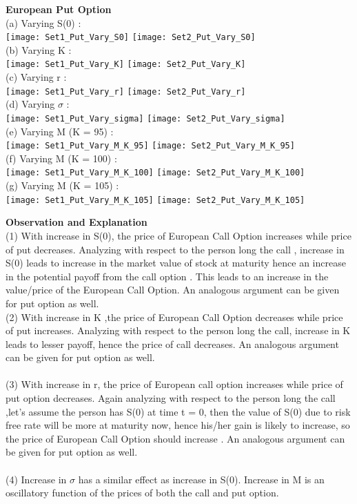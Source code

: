 \documentclass{article}
\begin{document}
\textbf{European Put Option}\\
(a) Varying S(0) :\\
\texttt{[image: Set1\_Put\_Vary\_S0]}
\quad \quad
\texttt{[image: Set2\_Put\_Vary\_S0]}\\
\newpage
(b) Varying K :\\
\texttt{[image: Set1\_Put\_Vary\_K]}
\quad \quad
\texttt{[image: Set2\_Put\_Vary\_K]}\\
(c) Varying r :\\
\texttt{[image: Set1\_Put\_Vary\_r]}
\quad \quad
\texttt{[image: Set2\_Put\_Vary\_r]}\\
(d) Varying $\sigma$ :\\
\texttt{[image: Set1\_Put\_Vary\_sigma]}
\quad \quad
\texttt{[image: Set2\_Put\_Vary\_sigma]}\\
\newpage
(e) Varying M (K = 95) :\\
\texttt{[image: Set1\_Put\_Vary\_M\_K\_95]}
\quad \quad
\texttt{[image: Set2\_Put\_Vary\_M\_K\_95]}\\
(f) Varying M (K = 100) :\\
\texttt{[image: Set1\_Put\_Vary\_M\_K\_100]}
\quad \quad
\texttt{[image: Set2\_Put\_Vary\_M\_K\_100]}\\
(g) Varying M (K = 105) :\\
\texttt{[image: Set1\_Put\_Vary\_M\_K\_105]}
\quad \quad
\texttt{[image: Set2\_Put\_Vary\_M\_K\_105]}


\textbf{Observation and Explanation}\\
(1) With increase in S(0), the price of European Call Option increases while price of put decreases. Analyzing with respect to the person long the call , increase in S(0) leads to increase in the market value of stock at maturity hence an increase in the potential payoff from the call option . This leads to an increase in the value/price of the European Call Option. An analogous argument can be given for put option as well.\\
(2) With increase in K ,the price of European Call Option decreases while price of put increases. Analyzing with respect to the person long the call, increase in K leads to lesser payoff, hence the price of call decreases. An analogous argument can be given for put option as well.\\\\
(3) With increase in r, the price of European call option increases while price of put option decreases. Again analyzing with respect to the person long the call ,let's assume the person has S(0) at time t = 0, then the value of S(0) due to risk free rate will be more at maturity now, hence his/her gain is likely to increase, so the price of European Call Option should increase . An analogous argument can be given for put option as well.\\\\
(4) Increase in $\sigma$ has a similar effect as increase in S(0). Increase in M is an oscillatory function of the prices of both the call and put option.
\end{document}

